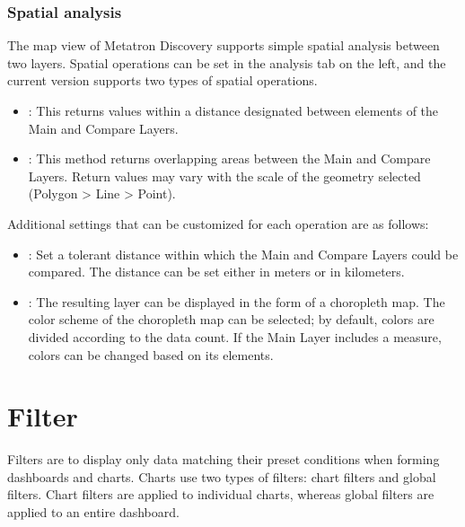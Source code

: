 \documentclass[letterpaper,10pt,english]{sphinxmanual}
\begin{document}
\subsubsection{Spatial analysis}
\label{\detokenize{discovery/part04/map_chart:id9}}
The map view of Metatron Discovery supports simple spatial analysis between two layers. Spatial operations can be set in the analysis tab on the left, and the current version supports two types of spatial operations.
\begin{quote}

\begin{figure}[H]
\centering

\noindent{}
\end{figure}
\end{quote}
\begin{itemize}
\item {} 
: This returns values within a distance designated between elements of the Main and Compare Layers.

\item {} 
: This method returns overlapping areas between the Main and Compare Layers. Return values may vary with the scale of the geometry selected (Polygon \textgreater{} Line \textgreater{} Point).

\end{itemize}

Additional settings that can be customized for each operation are as follows:
\begin{itemize}
\item {} 
: Set a tolerant distance within which the Main and Compare Layers could be compared. The distance can be set either in meters or in kilometers.

\item {} 
: The resulting layer can be displayed in the form of a choropleth map. The color scheme of the choropleth map can be selected; by default, colors are divided according to the data count. If the Main Layer includes a measure, colors can be changed based on its elements.

\end{itemize}


\section{Filter}
\label{\detokenize{discovery/part04/filters:id1}}\label{\detokenize{discovery/part04/filters::doc}}
Filters are to display only data matching their preset conditions when forming dashboards and charts. Charts use two types of filters: chart filters and global filters. Chart filters are applied to individual charts, whereas global filters are applied to an entire dashboard.
\end{document}
